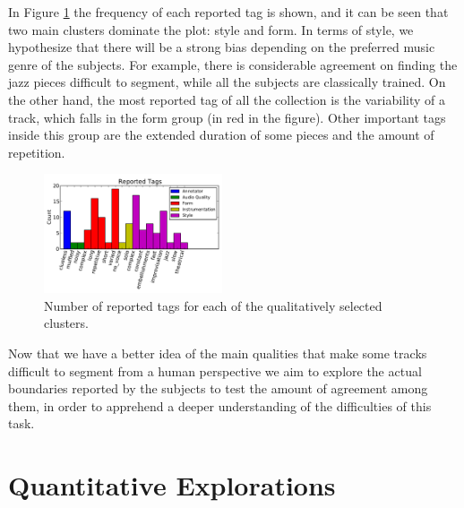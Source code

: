 \documentclass{article}
\begin{document}
In Figure \ref{fig:difficult-tags-type} the frequency of each reported tag is shown, and it can be seen that two main clusters dominate the plot: style and form.
In terms of style, we hypothesize that there will be a strong bias depending on the preferred music genre of the subjects.
For example, there is considerable agreement on finding the jazz pieces difficult to segment, while all the subjects are classically trained.
On the other hand, the most reported tag of all the collection is the variability of a track, which falls in the form group (in red in the figure).
Other important tags inside this group are the extended duration of some pieces and the amount of repetition.

\begin{figure}
  \centering
  \includegraphics[width=0.47\textwidth]{plots/reported-tags.pdf}
  \caption{Number of reported tags for each of the qualitatively selected clusters.}
  \label{fig:difficult-tags-type}
\end{figure}%

Now that we have a better idea of the main qualities that make some tracks difficult to segment from a human perspective we aim to explore the actual boundaries reported by the subjects to test the amount of agreement among them, in order to apprehend a deeper understanding of the difficulties of this task.

\section{Quantitative Explorations}


\end{document}
